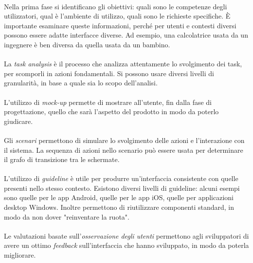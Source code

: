 \documentclass[12pt,a4paper,twoside,english,italian]{book}
\begin{document}
\paragraph{} Nella prima fase si identificano gli obiettivi: quali sono le competenze degli utilizzatori, qual è l'ambiente di utilizzo, quali sono le richieste specifiche. È importante esaminare queste informazioni, perché per utenti e contesti diversi possono essere adatte interfacce diverse. Ad esempio, una calcolatrice usata da un ingegnere è ben diversa da quella usata da un bambino. 

\paragraph{} La \emph{task analysis} è il processo che analizza attentamente lo svolgimento dei task, per scomporli in azioni fondamentali. Si possono usare diversi livelli di granularità, in base a quale sia lo scopo dell'analisi. 

\paragraph{} L'utilizzo di \emph{mock-up} permette di mostrare all'utente, fin dalla fase di progettazione, quello che sarà l'aspetto del prodotto in modo da poterlo giudicare.

\paragraph{} Gli \emph{scenari} permettono di simulare lo svolgimento delle azioni e l'interazione con il sistema. La sequenza di azioni nello scenario può essere usata per determinare il grafo di transizione tra le schermate.

\paragraph{} L'utilizzo di \emph{guideline} è utile per produrre un'interfaccia consistente con quelle presenti nello stesso contesto. Esistono diversi livelli di guideline: alcuni esempi sono quelle per le app Android, quelle per le app iOS, quelle per applicazioni desktop Windows. Inoltre permettono di riutilizzare componenti standard, in modo da non dover "reinventare la ruota". 

\paragraph{} Le valutazioni basate sull'\emph{osservazione degli utenti} permettono agli sviluppatori di avere un ottimo \emph{feedback} sull'interfaccia che hanno sviluppato, in modo da poterla migliorare.
\end{document}
